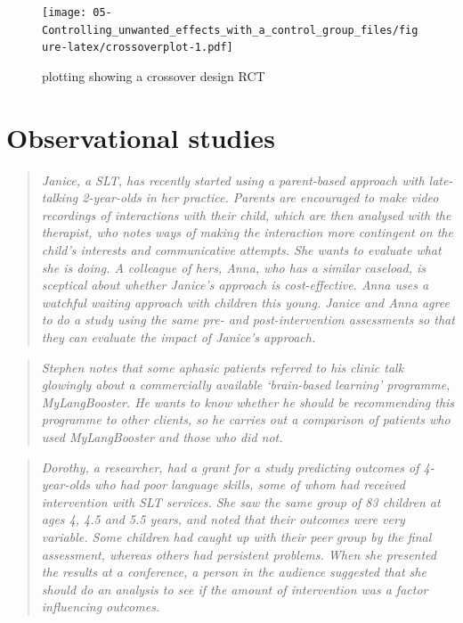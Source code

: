 \documentclass[]{book}
\begin{document}
\begin{figure}
\centering
\texttt{[image: 05-Controlling\_unwanted\_effects\_with\_a\_control\_group\_files/figure-latex/crossoverplot-1.pdf]}
\caption{\label{fig:crossoverplot}plotting showing a crossover design RCT}
\end{figure}

\hypertarget{observational-studies}{%
\chapter{Observational studies}\label{observational-studies}}

\begin{quote}
\emph{Janice, a SLT, has recently started using a parent-based approach with late-talking 2-year-olds in her practice. Parents are encouraged to make video recordings of interactions with their child, which are then analysed with the therapist, who notes ways of making the interaction more contingent on the child's interests and communicative attempts. She wants to evaluate what she is doing. A colleague of hers, Anna, who has a similar caseload, is sceptical about whether Janice's approach is cost-effective. Anna uses a watchful waiting approach with children this young. Janice and Anna agree to do a study using the same pre- and post-intervention assessments so that they can evaluate the impact of Janice's approach.}
\end{quote}

\begin{quote}
\emph{Stephen notes that some aphasic patients referred to his clinic talk glowingly about a commercially available `brain-based learning' programme, MyLangBooster. He wants to know whether he should be recommending this programme to other clients, so he carries out a comparison of patients who used MyLangBooster and those who did not.}
\end{quote}

\begin{quote}
\emph{Dorothy, a researcher, had a grant for a study predicting outcomes of 4-year-olds who had poor language skills, some of whom had received intervention with SLT services. She saw the same group of 83 children at ages 4, 4.5 and 5.5 years, and noted that their outcomes were very variable. Some children had caught up with their peer group by the final assessment, whereas others had persistent problems. When she presented the results at a conference, a person in the audience suggested that she should do an analysis to see if the amount of intervention was a factor influencing outcomes.}
\end{quote}
\end{document}
